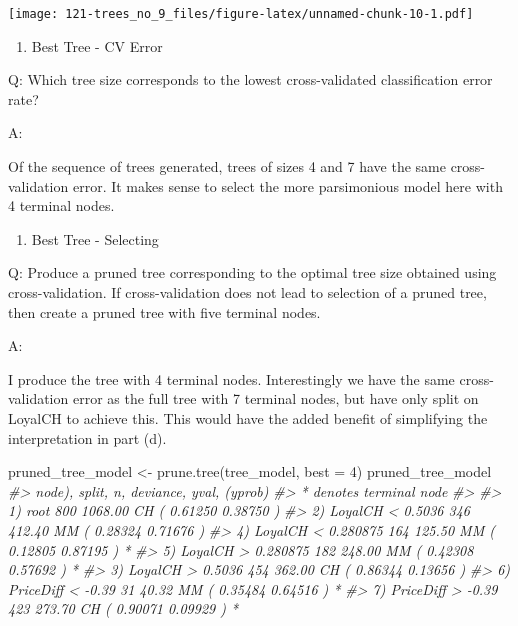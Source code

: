\documentclass[
]{book}
\newenvironment{Shaded}{\begin{snugshade}}{\end{snugshade}}
\newcommand{\AttributeTok}[1]{\textcolor[rgb]{0.77,0.63,0.00}{#1}}
\newcommand{\CommentTok}[1]{\textcolor[rgb]{0.56,0.35,0.01}{\textit{#1}}}
\newcommand{\DecValTok}[1]{\textcolor[rgb]{0.00,0.00,0.81}{#1}}
\newcommand{\FunctionTok}[1]{\textcolor[rgb]{0.00,0.00,0.00}{#1}}
\newcommand{\NormalTok}[1]{#1}
\newcommand{\OtherTok}[1]{\textcolor[rgb]{0.56,0.35,0.01}{#1}}
\providecommand{\tightlist}{%
  \setlength{\itemsep}{0pt}\setlength{\parskip}{0pt}}
\begin{document}
\texttt{[image: 121-trees\_no\_9\_files/figure-latex/unnamed-chunk-10-1.pdf]}

\begin{enumerate}
\def\labelenumi{(\alph{enumi})}
\setcounter{enumi}{7}
\tightlist
\item
  Best Tree - CV Error
\end{enumerate}

Q: Which tree size corresponds to the lowest cross-validated classification error rate?

A:

Of the sequence of trees generated, trees of sizes 4 and 7 have the same cross-validation error. It makes sense to select the more parsimonious model here with 4 terminal nodes.

\begin{enumerate}
\def\labelenumi{(\roman{enumi})}
\tightlist
\item
  Best Tree - Selecting
\end{enumerate}

Q: Produce a pruned tree corresponding to the optimal tree size obtained using cross-validation. If cross-validation does not lead to selection of a pruned tree, then create a pruned tree with five terminal nodes.

A:

I produce the tree with 4 terminal nodes. Interestingly we have the same cross-validation error as the full tree with 7 terminal nodes, but have only split on LoyalCH to achieve this. This would have the added benefit of simplifying the interpretation in part (d).

\begin{Shaded}
\begin{Highlighting}[]
\NormalTok{pruned\_tree\_model }\OtherTok{\textless{}{-}} \FunctionTok{prune.tree}\NormalTok{(tree\_model, }\AttributeTok{best =} \DecValTok{4}\NormalTok{)}
\NormalTok{pruned\_tree\_model}
\CommentTok{\#\textgreater{} node), split, n, deviance, yval, (yprob)}
\CommentTok{\#\textgreater{}       * denotes terminal node}
\CommentTok{\#\textgreater{} }
\CommentTok{\#\textgreater{} 1) root 800 1068.00 CH ( 0.61250 0.38750 )  }
\CommentTok{\#\textgreater{}   2) LoyalCH \textless{} 0.5036 346  412.40 MM ( 0.28324 0.71676 )  }
\CommentTok{\#\textgreater{}     4) LoyalCH \textless{} 0.280875 164  125.50 MM ( 0.12805 0.87195 ) *}
\CommentTok{\#\textgreater{}     5) LoyalCH \textgreater{} 0.280875 182  248.00 MM ( 0.42308 0.57692 ) *}
\CommentTok{\#\textgreater{}   3) LoyalCH \textgreater{} 0.5036 454  362.00 CH ( 0.86344 0.13656 )  }
\CommentTok{\#\textgreater{}     6) PriceDiff \textless{} {-}0.39 31   40.32 MM ( 0.35484 0.64516 ) *}
\CommentTok{\#\textgreater{}     7) PriceDiff \textgreater{} {-}0.39 423  273.70 CH ( 0.90071 0.09929 ) *}
\end{Highlighting}
\end{Shaded}
\end{document}
